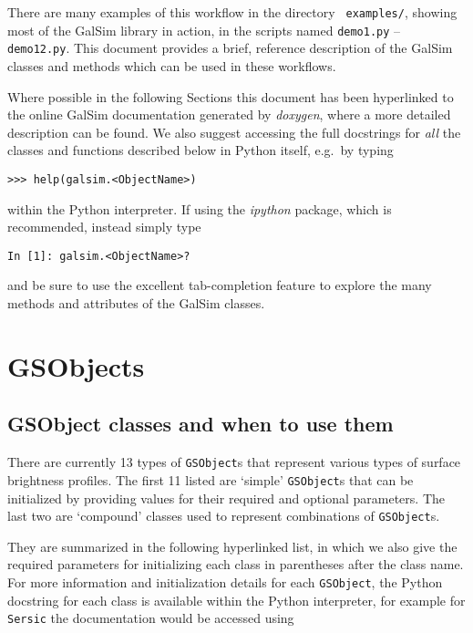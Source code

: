 \documentclass[preprint,11pt]{../../devel/modules/aastex}
\begin{document}
There are many examples of this workflow in the directory {\tt
 examples/}, showing most of the GalSim library in action, in
the scripts named \texttt{demo1.py} -- \texttt{demo12.py}.  This
document provides a brief, reference description of the GalSim classes
and methods which can be used in these workflows.

Where possible in the following Sections this document has been hyperlinked to the online
GalSim documentation generated by \emph{doxygen}, where a more detailed
description can be found.  We also suggest accessing the full docstrings for \emph{all} the
classes and functions described below in Python itself, e.g.\ by typing

{\tt >>> help(galsim.<ObjectName>)}

within the Python interpreter.  If using the \emph{ipython} package,
which is recommended, instead simply type

{\tt In [1]: galsim.<ObjectName>?}

and be sure to use the excellent tab-completion feature to explore the many
methods and attributes of the GalSim classes.


\section{GSObjects}\label{sect:gsobjects}

\subsection{GSObject classes and when to use them}\label{sect:gsobjectclasses}
There are currently 13 types of \texttt{GSObject}s that represent
various types of surface brightness profiles. The first 11 listed are
`simple' \texttt{GSObject}s that can be initialized by providing
values for their required and optional parameters.  The last two are
`compound' classes used to represent combinations of
\texttt{GSObject}s.

They are summarized in the following hyperlinked list, in which we also give
the required parameters for initializing each class in parentheses
after the class name.  For more information and initialization details for each \texttt{GSObject},
the Python docstring for each class is available within the Python interpreter, for example for
\texttt{Sersic} the documentation would be accessed using
\end{document}
